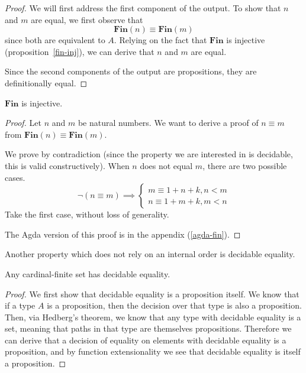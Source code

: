 \begin{refsection}
\begin{proof}
  We will first address the first component of the output.
  To show that \(n\) and \(m\) are equal, we first observe that
  \begin{equation}
    \textbf{Fin}(n) \equiv \textbf{Fin}(m)
  \end{equation}
  since both are equivalent to \(A\).
  Relying on the fact that \(\textbf{Fin}\) is injective
  (proposition~\ref{fin-inj}), we can derive that \(n\) and \(m\) are equal.

  Since the second components of the output are propositions, they are
  definitionally equal.
\end{proof}

\begin{lemma} \label{fin-inj}
  \(\textbf{Fin}\) is injective.
\end{lemma}
\begin{proof}
  Let \(n\) and \(m\) be natural numbers.
  We want to derive a proof of \(n \equiv m\) from \(\textbf{Fin}(n) \equiv
  \textbf{Fin}(m)\).

  We prove by contradiction (since the property we are interested in is
  decidable, this is valid constructively).
  When \(n\) does not equal \(m\), there are two possible cases.
  \begin{equation}
    \neg (n \equiv m) \implies
    \begin{cases}
      m \equiv 1 + n + k, n < m  \\
      n \equiv 1 + m + k, m < n
    \end{cases}
  \end{equation}
  Take the first case, without loss of generality.

  The Agda version of this proof is in the appendix (\ref{agda-fin}).
\end{proof}

Another property which does not rely on an internal order is decidable equality.
\begin{theorem} \label{cardinal-finite-discrete}
  Any cardinal-finite set has decidable equality.
\end{theorem}
\begin{proof}
  We first show that decidable equality is a proposition itself.
  We know that if a type \(A\) is a proposition, then the decision over that
  type is also a proposition.
  Then, via Hedberg's theorem, we know that any type with decidable equality is
  a set, meaning that paths in that type are themselves propositions.
  Therefore we can derive that a decision of equality on elements with decidable
  equality is a proposition, and by function extensionality we see that
  decidable equality is itself a proposition.


\end{proof}
\end{refsection}
